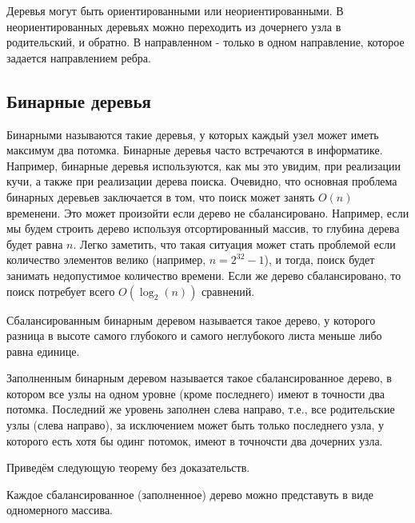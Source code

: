 Деревья могут быть ориентированными или неориентированными. В неориентированных
деревьях можно переходить из дочернего узла в родительский, и обратно. В направленном - 
только в одном направление, которое задается направлением ребра.

\subsection{Бинарные деревья}

Бинарными называются такие деревья, у которых каждый узел может иметь 
максимум два потомка. Бинарные деревья часто встречаются в информатике.
Например, бинарные деревья используются, как мы это увидим, при реализации
кучи, а также при реализации дерева поиска. Очевидно, что основная проблема
бинарных деревьев заключается в том, что поиск может занять $O(n)$ временени.
Это может произойти если дерево не сбалансировано. Например, если мы будем 
строить дерево используя отсортированный массив, то глубина дерева будет 
равна $n$. Легко заметить, что такая ситуация может стать проблемой если
количество элементов велико (например, $n=2^{32}-1$), и тогда, поиск будет 
занимать недопустимое количество времени. Если же дерево сбалансировано,
то поиск потребует всего $O(\log_2(n))$ сравнений.


\begin{definition}
Сбалансированным бинарным деревом называется такое дерево, у которого
разница в высоте самого глубокого и самого неглубокого листа меньше либо равна 
единице.
\end{definition}

\begin{definition}
Заполненным бинарным деревом называется такое сбалансированное дерево, в котором 
все узлы на одном уровне (кроме последнего) имеют в точности два потомка. Последний 
же уровень заполнен слева направо, т.е., все родительские узлы (слева направо), за
исключением может быть только последнего узла, у которого есть хотя бы одинг потомок, 
имеют в точночсти два дочерних узла. 
\end{definition}

Приведём следующую теорему без доказательств.

\begin{theorem}
Каждое сбалансированное (заполненное) дерево можно представуть в виде одномерного массива.
\end{theorem}


